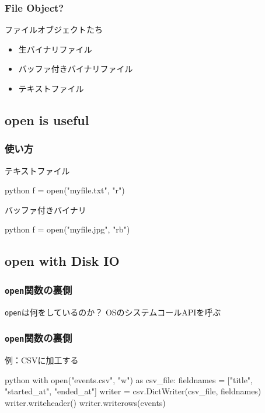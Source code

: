 \documentclass[aspectratio=169,dvipdfmx,14pt,notheorems]{beamer}
\theoremstyle{definition}
\begin{document}
\begin{frame}\frametitle{File Object?}

\begin{block}{ファイルオブジェクトたち}
\begin{itemize}
\item 生バイナリファイル
\item バッファ付きバイナリファイル
\item テキストファイル
\end{itemize}
\end{block}

\end{frame}

\subsection{open is useful}

\begin{frame}[fragile]\frametitle{使い方}

\begin{exampleblock}{テキストファイル}
\begin{pygments}{python}
f = open("myfile.txt", "r")
\end{pygments}
\end{exampleblock}

\begin{exampleblock}{バッファ付きバイナリ}
\begin{pygments}{python}
f = open("myfile.jpg", "rb")
\end{pygments}
\end{exampleblock}

\end{frame}

\subsection{open with Disk IO}

\begin{frame}\frametitle{\texttt{open}関数の裏側}
\begin{block}{\texttt{open}は何をしているのか？}
OSのシステムコールAPIを呼ぶ
\end{block}
\end{frame}

\begin{frame}[fragile]\frametitle{\texttt{open}関数の裏側}

\begin{exampleblock}{例：CSVに加工する}
\begin{pygments}{python}
with open("events.csv", "w") as csv_file:
    fieldnames = ["title", "started_at", "ended_at"]
    writer = csv.DictWriter(csv_file, fieldnames)
    writer.writeheader()
    writer.writerows(events)
\end{pygments}
\end{exampleblock}

\end{frame}
\end{document}
